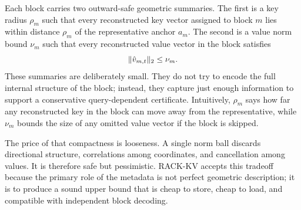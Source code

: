 Each block carries two outward-safe geometric summaries. The first is a key radius \(\rho_m\) such that every reconstructed key vector assigned to block \(m\) lies within distance \(\rho_m\) of the representative anchor \(a_m\). The second is a value norm bound \(\nu_m\) such that every reconstructed value vector in the block satisfies
\begin{equation}
  \lVert \hat{v}_{m,t} \rVert_2 \le \nu_m.
\end{equation}
These summaries are deliberately small. They do not try to encode the full internal structure of the block; instead, they capture just enough information to support a conservative query-dependent certificate. Intuitively, \(\rho_m\) says how far any reconstructed key in the block can move away from the representative, while \(\nu_m\) bounds the size of any omitted value vector if the block is skipped.

The price of that compactness is looseness. A single norm ball discards directional structure, correlations among coordinates, and cancellation among values. It is therefore safe but pessimistic. RACK-KV accepts this tradeoff because the primary role of the metadata is not perfect geometric description; it is to produce a sound upper bound that is cheap to store, cheap to load, and compatible with independent block decoding.

